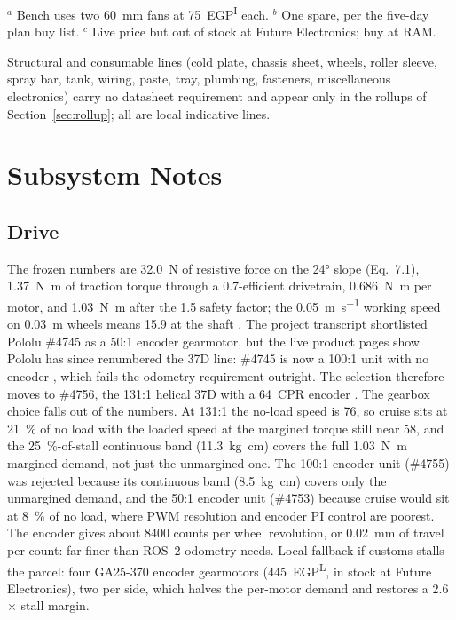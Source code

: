 \documentclass[11pt,a4paper]{article}
\newcommand{\liveflag}{\textsuperscript{L}}
\newcommand{\indflag}{\textsuperscript{I}}
\begin{document}
\noindent
$^{a}$ Bench uses two \SI{60}{\milli\metre} fans at \num{75}~EGP\indflag{}
each. $^{b}$ One spare, per the five-day plan buy list. $^{c}$ Live price but
out of stock at Future Electronics; buy at RAM.

Structural and consumable lines (cold plate, chassis sheet, wheels, roller
sleeve, spray bar, tank, wiring, paste, tray, plumbing, fasteners,
miscellaneous electronics) carry no datasheet requirement and appear only in
the rollups of Section~\ref{sec:rollup}; all are local indicative lines.

\section{Subsystem Notes}
\label{sec:notes}

\subsection{Drive}
The frozen numbers are \SI{32.0}{\newton} of resistive force on the \ang{24}
slope (Eq.~7.1), \SI{1.37}{\newton\metre} of traction torque through a
\num{0.7}-efficient drivetrain, \SI{0.686}{\newton\metre} per motor, and
\SI{1.03}{\newton\metre} after the 1.5 safety factor; the \SI{0.05}{\metre\per\second}
working speed on \SI{0.03}{\metre} wheels means \SI{15.9}{\rpm} at the shaft
\cite{siegwart2011mobilerobots}. The project transcript shortlisted Pololu
\#4745 as a 50:1 encoder gearmotor, but the live product pages show Pololu
has since renumbered the 37D line: \#4745 is now a 100:1 unit with no encoder
\cite{pololu4745}, which fails the odometry requirement outright. The
selection therefore moves to \#4756, the 131:1 helical 37D with a 64~CPR
encoder \cite{pololu4756}. The gearbox choice falls out of the numbers. At
131:1 the no-load speed is \SI{76}{\rpm}, so cruise sits at \SI{21}{\percent}
of no load with the loaded speed at the margined torque still near
\SI{58}{\rpm}, and the \SI{25}{\percent}-of-stall continuous band
(\SI{11.3}{\kilogram\centi\metre}) covers the full \SI{1.03}{\newton\metre}
margined demand, not just the unmargined one. The 100:1 encoder unit
(\#4755) was rejected because its continuous band
(\SI{8.5}{\kilogram\centi\metre}) covers only the unmargined demand, and the
50:1 encoder unit (\#4753) because cruise would sit at \SI{8}{\percent} of no
load, where PWM resolution and encoder PI control are poorest. The encoder
gives about \num{8400} counts per wheel revolution, or \SI{0.02}{\milli\metre}
of travel per count: far finer than ROS~2 odometry needs. Local fallback if
customs stalls the parcel: four GA25-370 encoder gearmotors
(\num{445}~EGP\liveflag{}, in stock at Future Electronics), two per side,
which halves the per-motor demand and restores a 2.6$\times$ stall margin.
\end{document}
